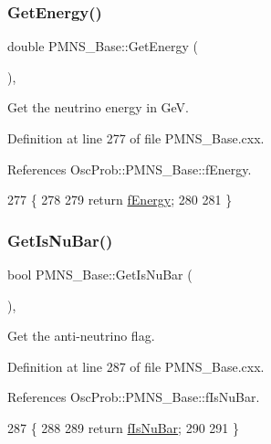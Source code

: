 \subsubsection{\texorpdfstring{Get\+Energy()}{GetEnergy()}}
{\footnotesize\ttfamily double P\+M\+N\+S\+\_\+\+Base\+::\+Get\+Energy (\begin{DoxyParamCaption}{ }\end{DoxyParamCaption})\hspace{0.3cm}{\ttfamily [virtual]}, {\ttfamily [inherited]}}

Get the neutrino energy in GeV. 

Definition at line 277 of file P\+M\+N\+S\+\_\+\+Base.\+cxx.



References Osc\+Prob\+::\+P\+M\+N\+S\+\_\+\+Base\+::f\+Energy.


\begin{DoxyCode}
277                             \{
278 
279   \textcolor{keywordflow}{return} \hyperlink{classOscProb_1_1PMNS__Base_a2800af6d436972f3e900867790c046b0}{fEnergy};
280 
281 \}
\end{DoxyCode}
\mbox{\label{classOscProb_1_1PMNS__Base_a2f7f2a028dfe7a90fff6b4f757972c2c}} 
\subsubsection{\texorpdfstring{Get\+Is\+Nu\+Bar()}{GetIsNuBar()}}
{\footnotesize\ttfamily bool P\+M\+N\+S\+\_\+\+Base\+::\+Get\+Is\+Nu\+Bar (\begin{DoxyParamCaption}{ }\end{DoxyParamCaption})\hspace{0.3cm}{\ttfamily [virtual]}, {\ttfamily [inherited]}}

Get the anti-\/neutrino flag. 

Definition at line 287 of file P\+M\+N\+S\+\_\+\+Base.\+cxx.



References Osc\+Prob\+::\+P\+M\+N\+S\+\_\+\+Base\+::f\+Is\+Nu\+Bar.


\begin{DoxyCode}
287                            \{
288 
289   \textcolor{keywordflow}{return} \hyperlink{classOscProb_1_1PMNS__Base_a0ebaeaefab36a3ff381c6293faedfdd6}{fIsNuBar};
290 
291 \}
\end{DoxyCode}
\mbox{\label{classOscProb_1_1PMNS__Base_a5092561dd8579d390c649eb60803ea98}} 

